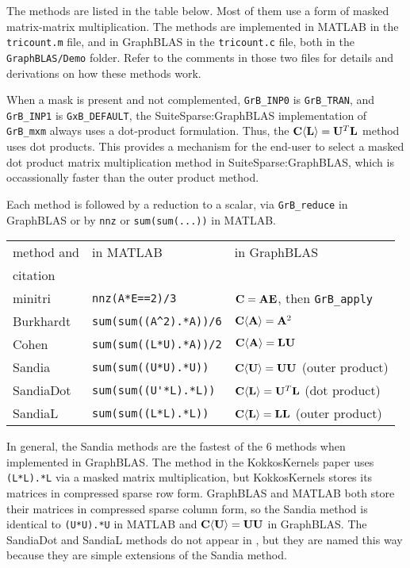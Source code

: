 \documentclass[12pt]{article}
\begin{document}
The methods are listed in the table below.  Most of them use a form of masked
matrix-matrix multiplication.  The methods are implemented in MATLAB in the
\verb'tricount.m' file, and in GraphBLAS in the \verb'tricount.c' file, both in
the \verb'GraphBLAS/Demo' folder.  Refer to the comments in those two files for
details and derivations on how these methods work.

When a mask is present and not complemented, \verb'GrB_INP0' is
\verb'GrB_TRAN', and \verb'GrB_INP1' is \verb'GxB_DEFAULT', the
SuiteSparse:GraphBLAS implementation of \verb'GrB_mxm' always uses a dot-product
formulation.  Thus, the ${\bf C \langle L \rangle} = {\bf U}^T{\bf L}$ method
uses dot products.  This provides a mechanism for the end-user to select a
masked dot product matrix multiplication method in SuiteSparse:GraphBLAS, which
is occassionally faster than the outer product method.

Each method is followed by a reduction to a scalar, via \verb'GrB_reduce' in
GraphBLAS or by \verb'nnz' or \verb'sum(sum(...))' in MATLAB.

\vspace{0.05in}
\noindent
{\small
\begin{tabular}{lll}
method and     & in MATLAB & in GraphBLAS \\
citation    & & \\
\hline 
minitri \cite{WolfBerryStark15} & \verb"nnz(A*E==2)/3"
    & ${\bf C}={\bf AE}$, then \verb'GrB_apply' \\
Burkhardt \cite{Burkhardt16} & \verb"sum(sum((A^2).*A))/6" 
    & ${\bf C \langle A \rangle} = {\bf A}^2$ \\
Cohen \cite{AzadBulucGilbert15,Cohen09} & \verb"sum(sum((L*U).*A))/2"
    & ${\bf C \langle A \rangle} = {\bf LU}$ \\
Sandia \cite{WolfDeveciBerryHammondRajamanickam17} & \verb"sum(sum((U*U).*U))"
    & ${\bf C \langle U \rangle} = {\bf UU}$ (outer product) \\
SandiaDot & \verb"sum(sum((U'*L).*L))"
    & ${\bf C \langle L \rangle} = {\bf U}^T{\bf L}$ (dot product) \\
SandiaL  & \verb"sum(sum((L*L).*L))"
    & ${\bf C \langle L \rangle} = {\bf LL}$ (outer product) \\
\hline 
\end{tabular}
}
\vspace{0.05in}

In general, the Sandia methods are the fastest of the 6 methods when
implemented in GraphBLAS.  The method in the KokkosKernels paper uses
\verb'(L*L).*L' via a masked matrix multiplication, but KokkosKernels stores
its matrices in compressed sparse row form.  GraphBLAS and MATLAB both store
their matrices in compressed sparse column form, so the Sandia method is
identical to \verb'(U*U).*U' in MATLAB and ${\bf C \langle U \rangle} = {\bf
UU}$ in GraphBLAS.  The SandiaDot and SandiaL methods do not appear in
\cite{WolfDeveciBerryHammondRajamanickam17}, but they are named this way
because they are simple extensions of the Sandia method.
\end{document}
